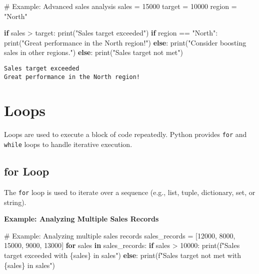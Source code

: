 \documentclass[
  letterpaper,
  DIV=11,
  numbers=noendperiod]{scrreprt}
\newenvironment{Shaded}{\begin{snugshade}}{\end{snugshade}}
\newcommand{\BuiltInTok}[1]{\textcolor[rgb]{0.00,0.23,0.31}{#1}}
\newcommand{\CommentTok}[1]{\textcolor[rgb]{0.37,0.37,0.37}{#1}}
\newcommand{\ControlFlowTok}[1]{\textcolor[rgb]{0.00,0.23,0.31}{\textbf{#1}}}
\newcommand{\DecValTok}[1]{\textcolor[rgb]{0.68,0.00,0.00}{#1}}
\newcommand{\KeywordTok}[1]{\textcolor[rgb]{0.00,0.23,0.31}{\textbf{#1}}}
\newcommand{\NormalTok}[1]{\textcolor[rgb]{0.00,0.23,0.31}{#1}}
\newcommand{\OperatorTok}[1]{\textcolor[rgb]{0.37,0.37,0.37}{#1}}
\newcommand{\SpecialCharTok}[1]{\textcolor[rgb]{0.37,0.37,0.37}{#1}}
\newcommand{\SpecialStringTok}[1]{\textcolor[rgb]{0.13,0.47,0.30}{#1}}
\newcommand{\StringTok}[1]{\textcolor[rgb]{0.13,0.47,0.30}{#1}}
\begin{document}
\begin{Shaded}
\begin{Highlighting}[]
\CommentTok{\# Example: Advanced sales analysis}
\NormalTok{sales }\OperatorTok{=} \DecValTok{15000}
\NormalTok{target }\OperatorTok{=} \DecValTok{10000}
\NormalTok{region }\OperatorTok{=} \StringTok{"North"}

\ControlFlowTok{if}\NormalTok{ sales }\OperatorTok{\textgreater{}}\NormalTok{ target:}
    \BuiltInTok{print}\NormalTok{(}\StringTok{"Sales target exceeded"}\NormalTok{)}
    \ControlFlowTok{if}\NormalTok{ region }\OperatorTok{==} \StringTok{"North"}\NormalTok{:}
        \BuiltInTok{print}\NormalTok{(}\StringTok{"Great performance in the North region!"}\NormalTok{)}
    \ControlFlowTok{else}\NormalTok{:}
        \BuiltInTok{print}\NormalTok{(}\StringTok{"Consider boosting sales in other regions."}\NormalTok{)}
\ControlFlowTok{else}\NormalTok{:}
    \BuiltInTok{print}\NormalTok{(}\StringTok{"Sales target not met"}\NormalTok{)}
\end{Highlighting}
\end{Shaded}

\begin{verbatim}
Sales target exceeded
Great performance in the North region!
\end{verbatim}

\section{Loops}\label{loops-3}

Loops are used to execute a block of code repeatedly. Python provides
\texttt{for} and \texttt{while} loops to handle iterative execution.

\subsection{for Loop}\label{for-loop-2}

The \texttt{for} loop is used to iterate over a sequence (e.g., list,
tuple, dictionary, set, or string).

\textbf{Example: Analyzing Multiple Sales Records}

\begin{Shaded}
\begin{Highlighting}[]
\CommentTok{\# Example: Analyzing multiple sales records}
\NormalTok{sales\_records }\OperatorTok{=}\NormalTok{ [}\DecValTok{12000}\NormalTok{, }\DecValTok{8000}\NormalTok{, }\DecValTok{15000}\NormalTok{, }\DecValTok{9000}\NormalTok{, }\DecValTok{13000}\NormalTok{]}
\ControlFlowTok{for}\NormalTok{ sales }\KeywordTok{in}\NormalTok{ sales\_records:}
    \ControlFlowTok{if}\NormalTok{ sales }\OperatorTok{\textgreater{}} \DecValTok{10000}\NormalTok{:}
        \BuiltInTok{print}\NormalTok{(}\SpecialStringTok{f"Sales target exceeded with }\SpecialCharTok{\{}\NormalTok{sales}\SpecialCharTok{\}}\SpecialStringTok{ in sales"}\NormalTok{)}
    \ControlFlowTok{else}\NormalTok{:}
        \BuiltInTok{print}\NormalTok{(}\SpecialStringTok{f"Sales target not met with }\SpecialCharTok{\{}\NormalTok{sales}\SpecialCharTok{\}}\SpecialStringTok{ in sales"}\NormalTok{)}
\end{Highlighting}
\end{Shaded}
\end{document}
